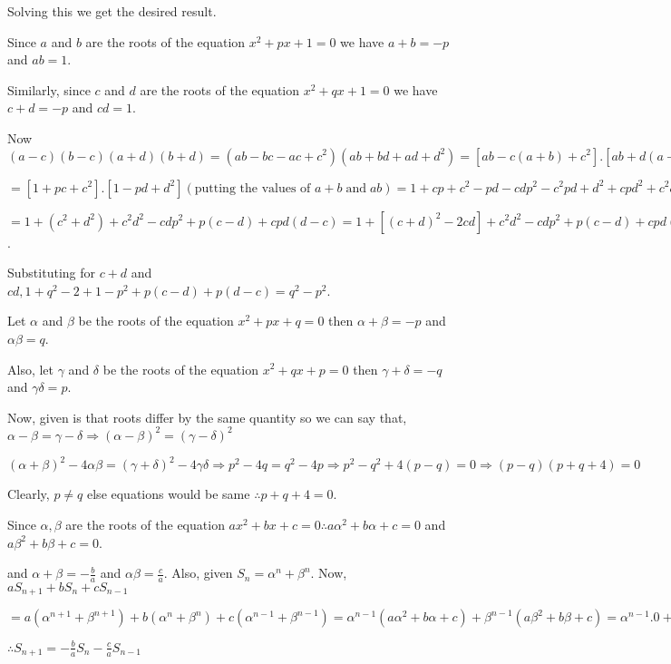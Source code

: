   Solving this we get the desired result.
\item Since $a$ and $b$ are the roots of the equation $x^2 + px + 1 = 0$ we have $a + b = -p$ and $ab = 1$.

  Similarly, since $c$ and $d$ are the roots of the equation $x^2 + qx + 1 = 0$ we have $c + d = -p$ and
  $cd = 1$.

  Now $(a - c)(b - c)(a + d)(b + d) = (ab - bc - ac + c^2)(ab + bd + ad + d^2) = [ab - c(a + b) + c^2].[ab +
    d(a + b) + d^2]$

  $= [1 + pc + c^2].[1 - pd + d^2] (\text{putting the values of } a + b\;\text{and}\;ab) = 1 + cp + c^2 - pd -
  cdp^2 - c^2pd + d^2 + cpd^2 + c^2d^2$

  $= 1 + (c^2 + d^2) + c^2d^2 -cdp^2 + p(c - d) + cpd(d - c) = 1 + [(c + d)^2 - 2cd] + c^2d^2 - cdp^2 + p(c
  - d) + cpd(d - c)$.

  Substituting for $c + d$ and $cd, 1 + q^2 - 2 + 1 - p^2 + p(c - d) + p(d - c) = q^2 - p^2$.
\item Let $\alpha$ and $\beta$ be the roots of the equation $x^2 + px + q = 0$ then $\alpha + \beta = -p$ and
  $\alpha\beta = q$.

  Also, let $\gamma$ and $\delta$ be the roots of the equation $x^2 + qx + p = 0$ then $\gamma + \delta =
  -q$ and $\gamma\delta = p$.

  Now, given is that roots differ by the same quantity so we can say that, $\alpha - \beta = \gamma -
  \delta\Rightarrow (\alpha - \beta)^2 = (\gamma - \delta)^2$

  $(\alpha + \beta)^2 - 4\alpha\beta = (\gamma + \delta)^2 - 4\gamma\delta\Rightarrow p^2 - 4q = q^2 - 4p
  \Rightarrow p^2 - q^2 + 4(p - q) = 0 \Rightarrow (p - q)(p + q + 4) = 0$

  Clearly, $p \neq q$ else equations would be same $\therefore p + q + 4 = 0$.
\item Since $\alpha, \beta$ are the roots of the equation $ax^2 + bx + c = 0\therefore a\alpha^2 + b\alpha +
  c = 0$ and $a\beta^2 + b\beta + c = 0$.

  and $\alpha + \beta = -\frac{b}{a}$ and $\alpha\beta = \frac{c}{a}.$ Also, given $S_n = \alpha^n +
  \beta^n$. Now, $aS_{n + 1} + bS_n + cS_{n - 1}$

  $= a(\alpha^{n + 1} + \beta^{n + 1}) + b(\alpha^n + \beta^n) + c(\alpha^{n - 1} + \beta^{n - 1}) =
  \alpha^{n - 1}(a\alpha^2 + b\alpha + c) + \beta^{n - 1}(a\beta^2 + b\beta + c) = \alpha^{n - 1}.0 +
  \beta^{n - 1}.0$

  $\therefore S_{n + 1} = -\frac{b}{a}S_n -\frac{c}{a}S_{n - 1}$

